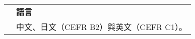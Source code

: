 \documentclass[letterpaper, 11pt]{article}
\begin{document}
\begin{CJK*}{UTF8}{bsmi}
\begin{center}
\begin{longtable}{p{0.72in}p{5.97in}}
        & \textbf{語言} \\
        & 中文、日文（CEFR B2）與英文（CEFR C1）。 \\
        
        
    \end{longtable}
\end{center}

\end{CJK*}
\end{document}
